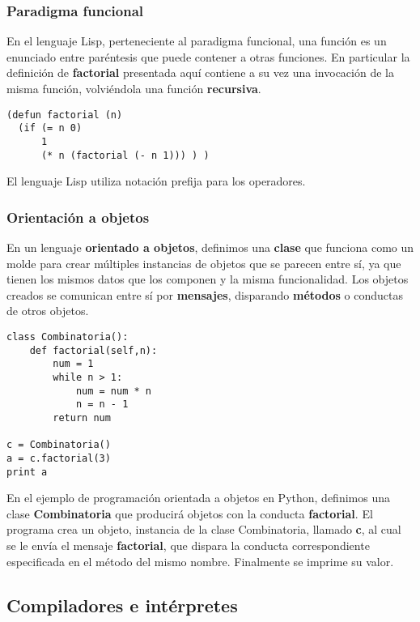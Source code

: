 \documentclass[spanish,a4paper,]{article}
\begin{document}
\hypertarget{paradigma-funcional}{%
\subsubsection{Paradigma funcional}\label{paradigma-funcional}}

En el lenguaje Lisp, perteneciente al paradigma funcional, una función
es un enunciado entre paréntesis que puede contener a otras funciones.
En particular la definición de \textbf{factorial} presentada aquí
contiene a su vez una invocación de la misma función, volviéndola una
función \textbf{recursiva}.

\begin{verbatim}
(defun factorial (n)
  (if (= n 0)
      1
      (* n (factorial (- n 1))) ) )
\end{verbatim}

El lenguaje Lisp utiliza notación prefija para los operadores.

\hypertarget{orientaciuxf3n-a-objetos}{%
\subsubsection{Orientación a objetos}\label{orientaciuxf3n-a-objetos}}

En un lenguaje \textbf{orientado a objetos}, definimos una
\textbf{clase} que funciona como un molde para crear múltiples
instancias de objetos que se parecen entre sí, ya que tienen los mismos
datos que los componen y la misma funcionalidad. Los objetos creados se
comunican entre sí por \textbf{mensajes}, disparando \textbf{métodos} o
conductas de otros objetos.

\begin{verbatim}
class Combinatoria():
    def factorial(self,n): 
        num = 1
        while n > 1:
            num = num * n
            n = n - 1
        return num

c = Combinatoria()
a = c.factorial(3)
print a
\end{verbatim}

En el ejemplo de programación orientada a objetos en Python, definimos
una clase \textbf{Combinatoria} que producirá objetos con la conducta
\textbf{factorial}. El programa crea un objeto, instancia de la clase
Combinatoria, llamado \textbf{c}, al cual se le envía el mensaje
\textbf{factorial}, que dispara la conducta correspondiente especificada
en el método del mismo nombre. Finalmente se imprime su valor.

\hypertarget{compiladores-e-intuxe9rpretes}{%
\subsection{Compiladores e
intérpretes}\label{compiladores-e-intuxe9rpretes}}
\end{document}
